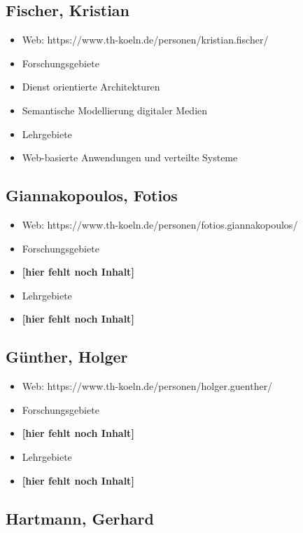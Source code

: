 \subsection{Fischer, Kristian}\label{fischer-kristian}

\begin{itemize}
\item
  Web: https://www.th-koeln.de/personen/kristian.fischer/
\item
  Forschungsgebiete
\item
  Dienst orientierte Architekturen
\item
  Semantische Modellierung digitaler Medien
\item
  Lehrgebiete
\item
  Web-basierte Anwendungen und verteilte Systeme
\end{itemize}

\subsection{Giannakopoulos, Fotios}\label{giannakopoulos-fotios}

\begin{itemize}
\item
  Web: https://www.th-koeln.de/personen/fotios.giannakopoulos/
\item
  Forschungsgebiete
\item
  \textbf{{[}hier fehlt noch Inhalt{]}}
\item
  Lehrgebiete
\item
  \textbf{{[}hier fehlt noch Inhalt{]}}
\end{itemize}

\subsection{Günther, Holger}\label{guxfcnther-holger}

\begin{itemize}
\item
  Web: https://www.th-koeln.de/personen/holger.guenther/
\item
  Forschungsgebiete
\item
  \textbf{{[}hier fehlt noch Inhalt{]}}
\item
  Lehrgebiete
\item
  \textbf{{[}hier fehlt noch Inhalt{]}}
\end{itemize}

\subsection{Hartmann, Gerhard}\label{hartmann-gerhard}

